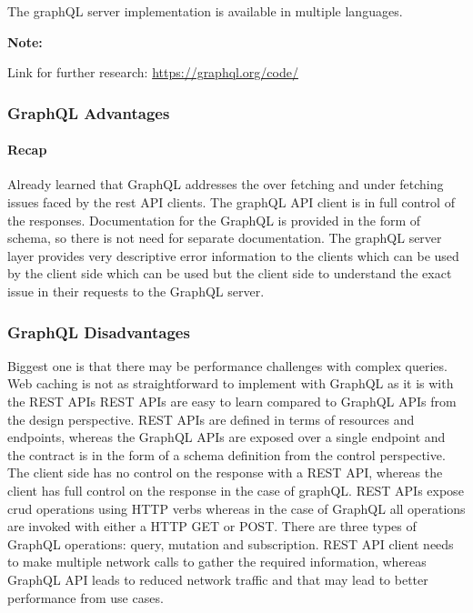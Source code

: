 \documentclass[a4paper, 11pt]{book}
\newenvironment{note}{
    \begin{siderule}
        \textbf{Note: }
        }{
    \end{siderule}
}
\begin{document}
    The graphQL server implementation is available in multiple languages.
    \begin{note}
        Link for further research: \href{https://graphql.org/code/}{https://graphql.org/code/}
    \end{note}

    \subsubsection{GraphQL Advantages}

    \paragraph{Recap}
    Already learned that GraphQL addresses the over fetching and under fetching issues faced by the rest API clients.
    The graphQL API client is in full control of the responses.
    Documentation for the GraphQL is provided in the form of schema, so there is not need for separate documentation.
    The graphQL server layer provides very descriptive error information to the clients which can be used by the client side which can be used but the client side to understand the exact issue in their requests to the GraphQL server.

    \subsubsection{GraphQL Disadvantages}
    Biggest one is that there may be performance challenges with complex queries.
    Web caching is not as straightforward to implement with GraphQL as it is with the REST APIs
    REST APIs are easy to learn compared to GraphQL APIs from the design perspective.
    REST APIs are defined in terms of resources and endpoints, whereas the GraphQL APIs are exposed over a single endpoint and the contract is in the form of a schema definition from the control perspective.
    The client side has no control on the response with a REST API, whereas the client has full control on the response in the case of graphQL.
    REST APIs expose crud operations using HTTP verbs whereas in the case of GraphQL all operations are invoked with either a HTTP GET or POST.
    There are three types of GraphQL operations: query, mutation and subscription.
    REST API client needs to make multiple network calls to gather the required information, whereas GraphQL API leads to reduced network traffic and that may lead to better performance from use cases.
\end{document}
